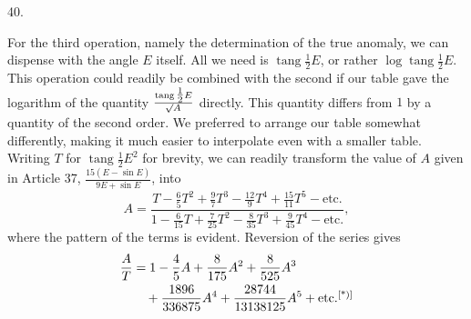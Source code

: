 \par{}
\begin{center}
\hypertarget{native-058-article040}{}40.
\end{center}
For the third operation, namely the determination of the true anomaly, we can dispense with the angle $E$ itself. All we need is $\operatorname{tang}\tfrac{1}{2}E$, or rather $\log\operatorname{tang}\tfrac{1}{2}E$. This operation could readily be combined with the second if our table gave the logarithm of the quantity $\frac{\operatorname{tang}\tfrac{1}{2}E}{\mathord{{}^{}\!\surd}A}$ directly. This quantity differs from $1$ by a quantity of the second order. We preferred to arrange our table somewhat differently, making it much easier to interpolate even with a smaller table. Writing $T$ for $\operatorname{tang}\tfrac{1}{2}E^2$ for brevity, we can readily transform the value of $A$ given in Article 37, $\frac{15(E-\sin E)}{9E+\sin E}$, into
\[
A=\frac{T-\tfrac{6}{5}T^2+\tfrac{9}{7}T^3-\tfrac{12}{9}T^4+\tfrac{15}{11}T^5-\text{etc.}}{1-\tfrac{6}{15}T+\tfrac{7}{25}T^2-\tfrac{8}{35}T^3+\tfrac{9}{45}T^4-\text{etc.}},
\]
where the pattern of the terms is evident. Reversion of the series gives
\[
\begin{aligned}
\frac{A}{T}&=1-\frac{4}{5}A+\frac{8}{175}A^2+\frac{8}{525}A^3\\
&\quad+\frac{1896}{336875}A^4+\frac{28744}{13138125}A^5+\text{etc.}\mbox{\HistoricalDisplayNoteMark}
\end{aligned}
\]
\noindent\HistoricalDisplayNoteText{Manuscript note:]
\[
\begin{aligned}
\log\operatorname{hyp}\frac{A}{T}&=-\frac{4}{5}A-\frac{48}{175}A^2-\frac{104}{875}A^3-\cdot\cdot\cdot\\
&=-\frac{4}{5}T+\frac{64}{175}T^2-\frac{8}{35}T^3+\cdot\cdot\cdot
\end{aligned}
\]
\[
\log\frac{A}{T}=-2Am=-2Tm'
\]
\begin{center}
\begin{tabular}{c|c|c@{\hspace{2em}}c|c}
$A$ & $\log m$ & $\log n$ & $T$ & $\log m'$ \\
$0.000$ & $9.23984$ & $9.63778$ & $0.000$ & $9.23984$ \\
$0.010$ & $9.24134$ & $9.63909$ & $0.010$ & $9.23787$ \\
$0.020$ & $9.24284$ & $9.64041$ & $0.020$ & $9.23591$ \\
$0.030$ & $9.24435$ & $9.64172$ & &
\end{tabular}
\end{center}
\[
\begin{gathered}
\operatorname{tang}\tfrac{1}{2}v=M\gamma\operatorname{tang}\tfrac{1}{2}w,\qquad r=\frac{q\sec\tfrac{1}{2}v^2}{N},\\
\log M=Am,\qquad \log N=An.
\end{gathered}
\]
}
